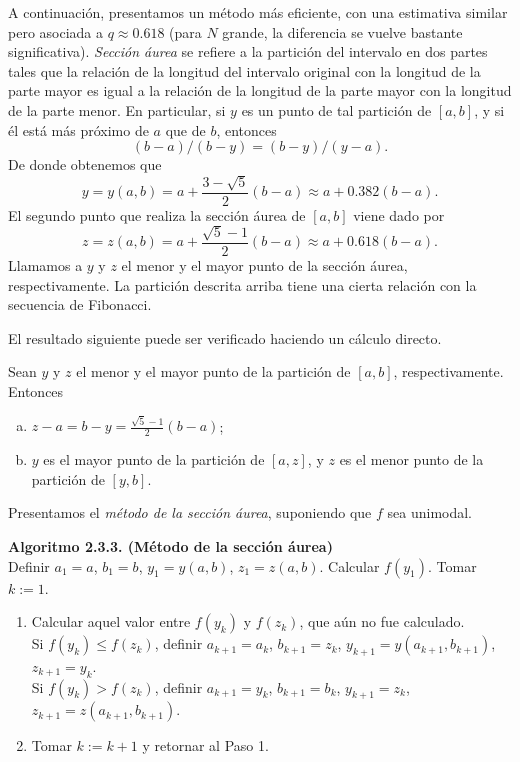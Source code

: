 A continuación, presentamos un método más eficiente, con una estimativa similar pero asociada a $q \approx 0.618$ (para $N$ grande, la diferencia se vuelve bastante significativa).
\textit{Sección áurea} se refiere a la partición del intervalo en dos partes tales que la relación de la longitud del intervalo original con la longitud de la parte mayor es igual a la relación de la longitud de la parte mayor con la longitud de la parte menor. En particular, si $y$ es un punto de tal partición de $[a, b]$, y si él está más próximo de $a$ que de $b$, entonces
\[
    (b - a)/(b - y) = (b - y)/(y - a).
\]
De donde obtenemos que
\[
    y = y(a, b) = a + \frac{3 - \sqrt{5}}{2}(b - a) \approx a + 0.382(b - a).
\]
El segundo punto que realiza la sección áurea de $[a, b]$ viene dado por
\[
    z = z(a, b) = a + \frac{\sqrt{5} - 1}{2}(b - a) \approx a + 0.618(b - a).
\]
Llamamos a $y$ y $z$ el menor y el mayor punto de la sección áurea, respectivamente. La partición descrita arriba tiene una cierta relación con la secuencia de Fibonacci.

El resultado siguiente puede ser verificado haciendo un cálculo directo.

\begin{lemma}\label{v2:lem:2.3.2}
    Sean $y$ y $z$ el menor y el mayor punto de la partición de $[a, b]$, respectivamente. Entonces
    \begin{enumerate}[(a)]
        \item $z - a = b - y = \frac{\sqrt{5} - 1}{2}(b - a)$;
        \item $y$ es el mayor punto de la partición de $[a, z]$, y $z$ es el menor punto de la partición de $[y, b]$.
    \end{enumerate}
\end{lemma}

Presentamos el \textit{método de la sección áurea}, suponiendo que $f$ sea unimodal.

\noindent \textbf{Algoritmo 2.3.3. (Método de la sección áurea)} \\
Definir $a_1 = a$, $b_1 = b$, $y_1 = y(a, b)$, $z_1 = z(a, b)$. Calcular $f(y_1)$. Tomar $k := 1$.
\begin{enumerate}
    \item[1.] Calcular aquel valor entre $f(y_k)$ y $f(z_k)$, que aún no fue calculado. \\
    Si $f(y_k) \le f(z_k)$, definir $a_{k+1} = a_k$, $b_{k+1} = z_k$, $y_{k+1} = y(a_{k+1}, b_{k+1})$, $z_{k+1} = y_k$. \\
    Si $f(y_k) > f(z_k)$, definir $a_{k+1} = y_k$, $b_{k+1} = b_k$, $y_{k+1} = z_k$, $z_{k+1} = z(a_{k+1}, b_{k+1})$.
    \item[2.] Tomar $k := k + 1$ y retornar al Paso 1.
\end{enumerate}

